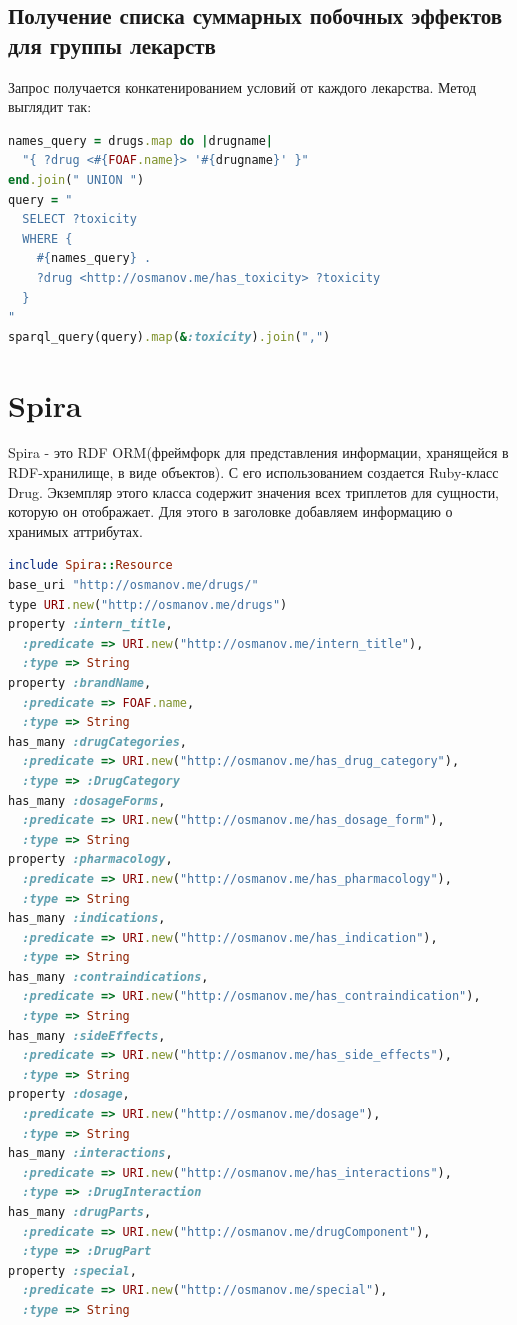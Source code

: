 \documentclass[specialist,subf,href,colorlinks=true
]{disser}
\begin{document}
\subsection{Получение списка суммарных побочных эффектов для группы лекарств}
Запрос получается конкатенированием условий от каждого лекарства. Метод выглядит так:
\begin{lstlisting}[language=Ruby]
names_query = drugs.map do |drugname|
  "{ ?drug <#{FOAF.name}> '#{drugname}' }"
end.join(" UNION ")
query = "
  SELECT ?toxicity
  WHERE {
    #{names_query} .
    ?drug <http://osmanov.me/has_toxicity> ?toxicity
  }
"
sparql_query(query).map(&:toxicity).join(",")
\end{lstlisting}

\section{Spira}
Spira - это RDF ORM(фреймфорк для представления информации, хранящейся в RDF-хранилище, в виде объектов).
С его использованием создается Ruby-класс Drug. Экземпляр этого класса содержит значения всех триплетов для сущности, которую он отображает.
Для этого в заголовке добавляем информацию о хранимых аттрибутах.
\begin{lstlisting}[language=Ruby]
include Spira::Resource
base_uri "http://osmanov.me/drugs/"
type URI.new("http://osmanov.me/drugs")
property :intern_title, 
  :predicate => URI.new("http://osmanov.me/intern_title"), 
  :type => String
property :brandName,  
  :predicate => FOAF.name, 
  :type => String
has_many :drugCategories, 
  :predicate => URI.new("http://osmanov.me/has_drug_category"), 
  :type => :DrugCategory
has_many :dosageForms, 
  :predicate => URI.new("http://osmanov.me/has_dosage_form"),
  :type => String
property :pharmacology, 
  :predicate => URI.new("http://osmanov.me/has_pharmacology"), 
  :type => String
has_many :indications, 
  :predicate => URI.new("http://osmanov.me/has_indication"), 
  :type => String
has_many :contraindications, 
  :predicate => URI.new("http://osmanov.me/has_contraindication"), 
  :type => String
has_many :sideEffects, 
  :predicate => URI.new("http://osmanov.me/has_side_effects"), 
  :type => String
property :dosage, 
  :predicate => URI.new("http://osmanov.me/dosage"), 
  :type => String
has_many :interactions, 
  :predicate => URI.new("http://osmanov.me/has_interactions"), 
  :type => :DrugInteraction
has_many :drugParts, 
  :predicate => URI.new("http://osmanov.me/drugComponent"), 
  :type => :DrugPart
property :special, 
  :predicate => URI.new("http://osmanov.me/special"), 
  :type => String
\end{lstlisting}
\end{document}
